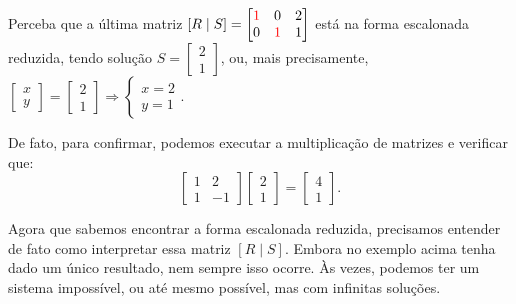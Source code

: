 \documentclass[../main.tex]{subfiles}
\begin{document}
\begin{exemplo}
				Perceba que a última matriz $[R\mid S]=\begin{bmatrix}
					{\color{red}1} & 0 & 2\\
					0 & {\color{red}1} & 1
				\end{bmatrix}$ está na forma escalonada reduzida, tendo solução $S=\begin{bmatrix}
				2\\1
				\end{bmatrix}$, ou, mais precisamente, $\begin{bmatrix}
				x\\y
				\end{bmatrix}=\begin{bmatrix}
				2\\1
				\end{bmatrix}\Rightarrow \begin{cases}
				x=2\\y=1
				\end{cases}$.
				
				De fato, para confirmar, podemos executar a multiplicação de matrizes e verificar que:
				\[
				\begin{bmatrix}
					1 & 2 \\
					1 & -1
				\end{bmatrix}
				\begin{bmatrix}
					2\\
					1
				\end{bmatrix}
				=
				\begin{bmatrix}
					4\\
					1
				\end{bmatrix}.
				\]
				\label{ex:SLescalonamento}
			\end{exemplo}
			Agora que sabemos encontrar a forma escalonada reduzida, precisamos entender de fato como interpretar essa matriz $[R\mid S]$. Embora no exemplo acima tenha dado um único resultado, nem sempre isso ocorre. Às vezes, podemos ter um sistema impossível, ou até mesmo possível, mas com infinitas soluções.
			
\end{document}
